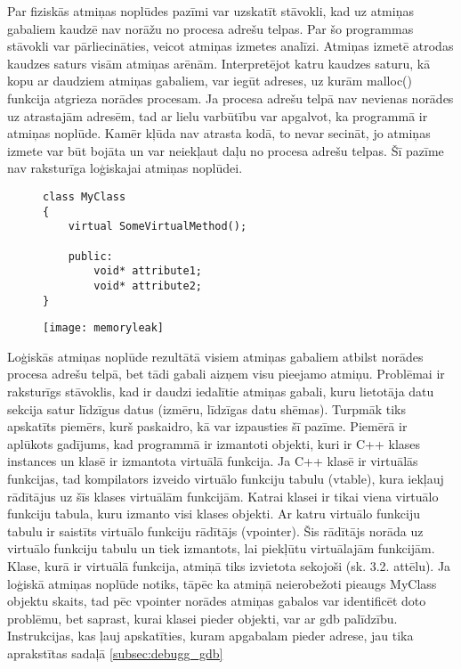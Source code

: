 Par fiziskās atmiņas noplūdes pazīmi var uzskatīt stāvokli, kad uz atmiņas gabaliem kaudzē nav norāžu no procesa adrešu telpas.
Par šo programmas stāvokli var pārliecināties, veicot atmiņas izmetes analīzi.
Atmiņas izmetē atrodas kaudzes saturs visām atmiņas arēnām.
Interpretējot katru kaudzes saturu, kā kopu ar daudziem atmiņas gabaliem, var iegūt adreses, uz kurām malloc() funkcija atgrieza norādes procesam.
Ja procesa adrešu telpā nav nevienas norādes uz atrastajām adresēm, tad ar lielu varbūtību var apgalvot, ka programmā ir atmiņas noplūde.
Kamēr kļūda nav atrasta kodā, to nevar secināt, jo atmiņas izmete var būt bojāta un var neiekļaut daļu no procesa adrešu telpas.
Šī pazīme nav raksturīga loģiskajai atmiņas noplūdei.


\begin{figure}[h]
\begin{lstlisting}
class MyClass
{
    virtual SomeVirtualMethod();

    public:
        void* attribute1;
        void* attribute2;
}
\end{lstlisting}
\end{figure}
\begin{figure}[h]
\begin{center}
\texttt{[image: memoryleak]}
\end{center}
\caption{\textbf{\fontsize{11}{12}\selectfont {C++ klases ar virtuālo funkciju izvietojums atmiņā }}}
\label{fig:memoryleak}
\end{figure}

Loģiskās atmiņas noplūde rezultātā visiem atmiņas gabaliem atbilst norādes procesa adrešu telpā, bet tādi gabali aizņem visu pieejamo atmiņu.
Problēmai ir raksturīgs stāvoklis, kad ir daudzi iedalītie atmiņas gabali, kuru lietotāja datu sekcija satur līdzīgus datus (izmēru, līdzīgas datu shēmas).
Turpmāk tiks apskatīts piemērs, kurš paskaidro, kā var izpausties šī pazīme.
Piemērā ir aplūkots gadījums, kad programmā ir izmantoti objekti, kuri ir  C++ klases instances un klasē ir izmantota virtuālā funkcija.
Ja C++ klasē ir virtuālās funkcijas, tad kompilators izveido virtuālo funkciju tabulu (vtable), kura iekļauj rādītājus uz šīs klases virtuālām funkcijām.
 Katrai klasei ir tikai viena virtuālo funkciju tabula, kuru izmanto visi klases objekti.
 Ar katru virtuālo funkciju tabulu ir saistīts virtuālo funkciju rādītājs (vpointer).
 Šis rādītājs norāda uz virtuālo funkciju tabulu un tiek izmantots, lai piekļūtu virtuālajām funkcijām.
Klase, kurā ir virtuālā funkcija, atmiņā tiks izvietota sekojoši (sk. 3.2. attēlu).
Ja loģiskā atmiņas noplūde notiks, tāpēc ka atmiņā neierobežoti pieaugs MyClass objektu skaits, tad pēc vpointer norādes atmiņas gabalos var identificēt doto problēmu, bet saprast, kurai klasei pieder objekti, var ar gdb palīdzību.
Instrukcijas, kas ļauj apskatīties, kuram apgabalam pieder adrese, jau tika aprakstītas sadaļā \ref{subsec:debugg_gdb}


